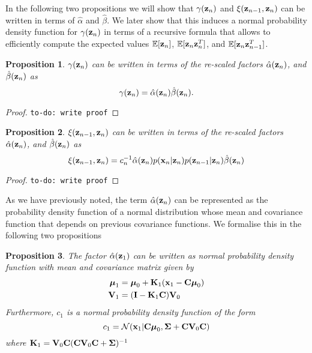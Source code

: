 \documentclass[11pt]{article}
\newtheorem{proposition}{Proposition}[section]
\begin{document}
In the following two propositions we will show that $\gamma({\bf z}_n)$ and $\xi({\bf z}_{n-1}, {\bf z}_{n})$ can be written in terms of $\hat\alpha$ and $\hat\beta$. We later show that this induces a normal probability density function for $\gamma({\bf z}_n)$ in terms of a recursive formula that allows to efficiently compute the expected values $\mathbb{E}[{\bf z}_n]$, $\mathbb{E}[{\bf z}_n{\bf z}_{n}^{T}]$, and  $\mathbb{E}[{\bf z}_n{\bf z}_{n-1}^{T}]$.


\begin{proposition}
	$\gamma({\bf z}_n)$ can be written in terms of the re-scaled factors $\hat\alpha({\bf z}_n)$, and $\hat\beta({\bf z}_n)$ as
	\begin{equation}
		\gamma({\bf z}_n) = \hat\alpha({\bf z}_n)\hat\beta({\bf z}_n).
	\end{equation}
\end{proposition}

\begin{proof}
	\texttt{to-do: write proof}
\end{proof}

\begin{proposition}
	$\xi({\bf z}_{n-1}, {\bf z}_n)$ can be written in terms of the re-scaled factors $\hat\alpha({\bf z}_n)$, and $\hat\beta({\bf z}_n)$ as
	\begin{equation}
		\xi({\bf z}_{n-1}, {\bf z}_{n}) = c_n^{-1}\hat\alpha({\bf z}_n)p({\bf x}_n \vert {\bf z}_n) p({\bf z}_{n-1}\vert {\bf z}_n)\hat\beta({\bf z}_n)
	\end{equation}
\end{proposition}

\begin{proof}
	\texttt{to-do: write proof}
\end{proof}


As we have previously noted, the term $\hat\alpha({\bf z}_n)$ can be represented as the probability density function of a normal distribution whose mean and covariance function that depends on previous covariance functions. We formalise this in the following two propositions

\begin{proposition}
	The factor $\hat\alpha({\bf z}_1)$ can be written as normal probability density function with mean and covariance matrix given by
	\begin{align}
		\boldsymbol{\mu}_1 &= \boldsymbol{\mu}_0 + {\bf K}_1({\bf x}_1 -{\bf C}\boldsymbol\mu_0)\\
		{\bf V}_1 &=  ({\bf I} - {\bf K}_1{\bf C}){\bf V}_0
	\end{align}
	Furthermore, $c_1$ is a normal probability density function of the form
	\begin{equation}
		c_1 = \mathcal{N}({\bf x}_1\vert {\bf C}\boldsymbol\mu_0, \boldsymbol\Sigma + {\bf C} {\bf V}_0 {\bf C})
	\end{equation}
	where ${\bf K}_1 = {\bf V}_0{\bf C}({\bf C} {\bf V}_0 {\bf C} + \boldsymbol\Sigma)^{-1}$
\end{proposition}
\end{document}
